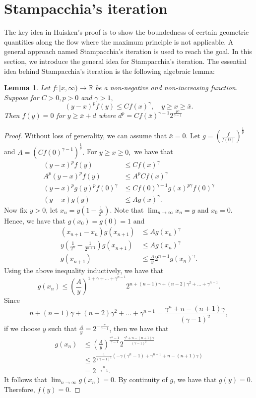 \documentclass[a4paper]{report}
\newtheorem{lemma}{Lemma}
\newcommand{\R}{\mathbb{R}}
\theoremstyle{remark}
\begin{document}
\section{Stampacchia's iteration}
The key idea in Huisken's proof is to show the boundedness of certain geometric quantities along the flow where the maximum principle is not applicable. A general approach named Stampacchia's iteration is used to reach the goal. In this section, we introduce the general idea for Stampacchia's iteration.
The essential idea behind Stampacchia's iteration is the following algebraic lemma:
\begin{lemma}
	Let $f : [\bar{x},\infty) \to \R$ be a non-negative and non-increasing function. Suppose for $C>0, p>0$ and $\gamma >1,$ 
	\[ (y-x)^{p}f(y) \leq Cf(x)^{\gamma }, \quad y \geq x \geq \bar{x}.\] 
	Then $f(y)=0$ for $y \geq \bar{x} + d$ where $d^p=C f(\bar{x})^{\gamma -1}2^{\frac{p \gamma }{\gamma -1}}$ 
\end{lemma}
\begin{proof}
	Without loss of generality, we can assume that $\bar{x}=0.$ 
	Let $g=(\frac{f}{f(0)})^{\frac{1}{p}}$ and $A=(Cf(0)^{\gamma -1})^{\frac{1}{p}}.$ For $y \geq x \geq 0,$ we have that
	\begin{align*}
		(y-x)^{p}f(y) &\leq Cf(x)^{\gamma }\\
		A^p (y-x)^{p}f(y) &\leq A^p Cf(x)^{\gamma }\\
		(y-x)^p g(y)^p f(0)^{\gamma } &\leq C f(0)^{\gamma-1 }g(x)^{p \gamma } f(0)^{\gamma }\\
		(y-x)g(y) &\leq A g(x)^{\gamma }.
	\end{align*}
	Now fix $y>0$, let $x_n=y(1-\frac{1}{2^n})$. Note that $\lim_{n \to \infty} x_n=y$ and $x_0=0.$ Hence, we have that $g(x_0)=g(0)=1$ and 
	\begin{align*}
		(x_{n+1}-x_n)g(x_{n+1}) &\leq Ag(x_{n}^{} )^{\gamma }\\
		y(\frac{1}{2^{n}}-\frac{1}{2^{n+1}})g(x_{n+1}^{} ) &\leq Ag(x_{n}^{} )^{\gamma }\\
		g(x_{n+1}^{} ) &\leq \frac{A}{y}2^{n+1} g(x_{n}^{} )^{\gamma }.
	\end{align*} 
	Using the above inequality inductively, we have that \[g(x_{n}^{} ) \leq (\frac{A}{y})^{1+\gamma + \dots + \gamma ^{n-1}} 2^{n+(n-1)\gamma + (n-2)\gamma ^2 + \dots + \gamma ^{n-1}}.\]
	Since \[n+(n-1)\gamma + (n-2)\gamma ^2 + \dots + \gamma ^{n-1}=\frac{\gamma ^n+n-(n+1)\gamma }{(\gamma -1)^2},\]
	if we choose $y$ such that $\frac{A}{y}=2^{-\frac{\gamma }{\gamma -1}}$, then we have that 
	\begin{equation*}
	\begin{split}
		g(x_{n}^{} ) 
	&\leq  (\frac{A}{y})^{\frac{\gamma ^n-1}{\gamma -1}} 2^{\frac{\gamma ^n+n-(n+1)\gamma }{(\gamma -1)^2}} \\
	&\leq 2^{\frac{1}{(\gamma -1)^2}(-\gamma (\gamma ^n-1)+\gamma ^{n+1}+n-(n+1)\gamma )}\\
	&=2^{-\frac{n}{\gamma -1}}.
	\end{split}
	\end{equation*}
	It follows that $\lim_{n \to \infty} g(x_n)=0$. By continuity of $g$, we have that $g(y)=0.$ Therefore, $f(y)=0.$  
\end{proof}


\end{document}

